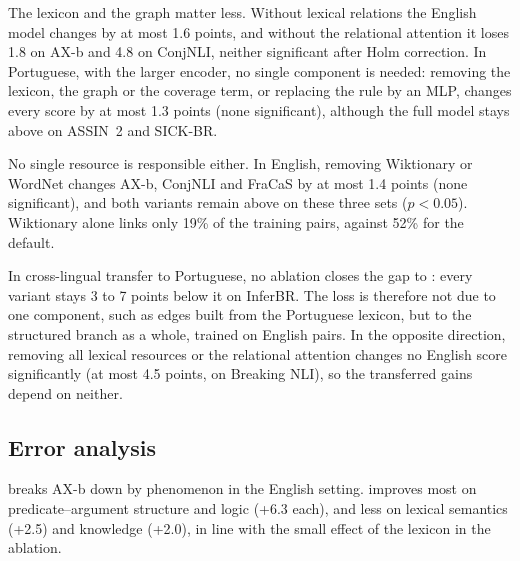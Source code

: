 The lexicon and the graph matter less. Without lexical relations the English model changes by at most
1.6 points, and without the relational attention it loses 1.8 on AX-b and 4.8 on ConjNLI, neither
significant after Holm correction. In Portuguese, with the larger encoder, no single component is needed: removing the lexicon, the graph
or the coverage term, or replacing the rule by an MLP, changes every score by at most 1.3 points (none
significant), although the full model stays above \cls{} on ASSIN~2 and SICK-BR.

No single resource is responsible either. In English, removing Wiktionary or WordNet changes AX-b,
ConjNLI and FraCaS by at most 1.4 points (none significant), and both variants remain above \cls{} on
these three sets ($p<0.05$). Wiktionary alone links only 19\% of the training pairs, against 52\% for
the default.

In cross-lingual transfer to Portuguese, no ablation closes the gap to \cls{}: every variant stays 3 to
7 points below it on InferBR. The loss is therefore not due to one component, such as edges built
from the Portuguese lexicon, but to the structured branch as a whole, trained on English pairs. In the
opposite direction, removing all lexical resources or the relational attention changes no English score
significantly (at most 4.5 points, on Breaking NLI), so the transferred gains depend on neither.

\subsection{Error analysis}
\label{sec:error-analysis}

\begin{table}[tp]
  \centering\footnotesize
  \setlength{\tabcolsep}{2pt}
  
  \caption{AX-b by category and the phenomena with the largest gains and losses, English setting
  (binary MCC $\times100$, mean over 10 seeds). $\Delta$: \model{} $-$ \cls{}. Groups with $n<40$ are
  exploratory.}
  \label{tab:axb-categories}
\end{table}

 breaks AX-b down by phenomenon in the English setting. \model{} improves most on
predicate--argument structure and logic (+6.3 each), and less on lexical semantics (+2.5) and
knowledge (+2.0), in line with the small effect of the lexicon in the ablation.

